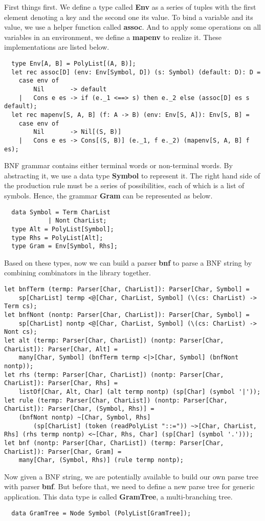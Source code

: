 First things first. We define a type called \textbf{Env} as a series of tuples with the first element denoting a key and the second one its value. To bind a variable and its value, we use a helper function called \textbf{assoc}. And to apply some operations on all variables in an environment, we define a \textbf{mapenv} to realize it. These implementations are listed below.
\begin{lstlisting}
  type Env[A, B] = PolyList[(A, B)];
  let rec assoc[D] (env: Env[Symbol, D]) (s: Symbol) (default: D): D =
	case env of
		Nil       -> default
	|	Cons e es -> if (e._1 <==> s) then e._2 else (assoc[D] es s default);
  let rec mapenv[S, A, B] (f: A -> B) (env: Env[S, A]): Env[S, B] =
	case env of
		Nil       -> Nil[(S, B)]
	|	Cons e es -> Cons[(S, B)] (e._1, f e._2) (mapenv[S, A, B] f es);
\end{lstlisting}
BNF grammar contains either terminal words or non-terminal words. By abstracting it, we use a data type \textbf{Symbol} to represent it. The right hand side of the production rule must be a series of possibilities, each of which is a list of symbols. Hence, the grammar \textbf{Gram} can be represented as below.
\begin{lstlisting}
  data Symbol = Term CharList
			| Nont CharList;
  type Alt = PolyList[Symbol];
  type Rhs = PolyList[Alt];
  type Gram = Env[Symbol, Rhs];
\end{lstlisting}
Based on these types, now we can build a parser \textbf{bnf} to parse a BNF string by combining combinators in the library together.
\begin{lstlisting}
let bnfTerm (termp: Parser[Char, CharList]): Parser[Char, Symbol] =
	sp[CharList] termp <@[Char, CharList, Symbol] (\(cs: CharList) -> Term cs);
let bnfNont (nontp: Parser[Char, CharList]): Parser[Char, Symbol] =
	sp[CharList] nontp <@[Char, CharList, Symbol] (\(cs: CharList) -> Nont cs);
let alt (termp: Parser[Char, CharList]) (nontp: Parser[Char, CharList]): Parser[Char, Alt] =
	many[Char, Symbol] (bnfTerm termp <|>[Char, Symbol] (bnfNont nontp));
let rhs (termp: Parser[Char, CharList]) (nontp: Parser[Char, CharList]): Parser[Char, Rhs] =
	listOf[Char, Alt, Char] (alt termp nontp) (sp[Char] (symbol '|'));
let rule (termp: Parser[Char, CharList]) (nontp: Parser[Char, CharList]): Parser[Char, (Symbol, Rhs)] =
	(bnfNont nontp) ~[Char, Symbol, Rhs]
		(sp[CharList] (token (readPolyList "::=")) ~>[Char, CharList, Rhs] (rhs termp nontp) <~[Char, Rhs, Char] (sp[Char] (symbol '.')));
let bnf (nontp: Parser[Char, CharList]) (termp: Parser[Char, CharList]): Parser[Char, Gram] =
	many[Char, (Symbol, Rhs)] (rule termp nontp);
\end{lstlisting}
Now given a BNF string, we are potentially available to build our own parse tree with parser \textbf{bnf}. But before that, we need to define a new parse tree for generic application. This data type is called \textbf{GramTree}, a multi-branching tree.
\begin{lstlisting}
  data GramTree = Node Symbol (PolyList[GramTree]);
\end{lstlisting}

